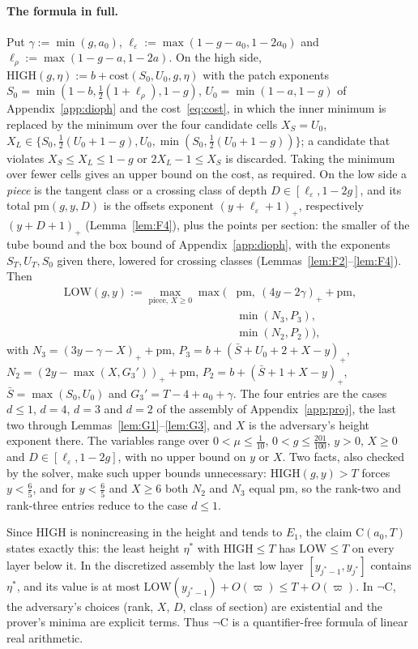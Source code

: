 \documentclass[aps,prx,twocolumn,superscriptaddress,nofootinbib,longbibliography]{revtex4-2}
\theoremstyle{plain}
\theoremstyle{definition}
\theoremstyle{remark}
\begin{document}
\paragraph{The formula in full.} Put $\gamma:=\min(g,a_0)$, $\ell_\varepsilon:=\max(1-g-a_0,1-2a_0)$ and $\ell_\rho:=\max(1-g-a,1-2a)$. On the high side, $\mathrm{HIGH}(g,\eta):=b+\mathrm{cost}(S_0,U_0,g,\eta)$ with the patch exponents $S_0=\min(1-b,\tfrac12(1+\ell_\rho),1-g)$, $U_0=\min(1-a,1-g)$ of Appendix~\ref{app:dioph} and the cost~\eqref{eq:cost}, in which the inner minimum is replaced by the minimum over the four candidate cells $X_S=U_0$, $X_L\in\{S_0,\tfrac12(U_0+1-g),U_0,\min(S_0,\tfrac12(U_0+1-g))\}$; a candidate that violates $X_S\le X_L\le1-g$ or $2X_L-1\le X_S$ is discarded. Taking the minimum over fewer cells gives an upper bound on the cost, as required. On the low side a \emph{piece} is the tangent class or a crossing class of depth $D\in[\ell_\varepsilon,1-2g]$, and its total $\mathrm{pm}(g,y,D)$ is the offsets exponent $(y+\ell_\varepsilon+1)_+$, respectively $(y+D+1)_+$ (Lemma~\ref{lem:F4}), plus the points per section: the smaller of the tube bound and the box bound of Appendix~\ref{app:dioph}, with the exponents $S_T,U_T,S_0$ given there, lowered for crossing classes (Lemmas~\ref{lem:F2}--\ref{lem:F4}). Then
\[\begin{aligned}\mathrm{LOW}(g,y):=\max_{\text{piece},\,X\ge0}\max\big(&\mathrm{pm},\ (4y-2\gamma)_++\mathrm{pm},\\&\min(N_3,P_3),\\&\min(N_2,P_2)\big),\end{aligned}\]
with $N_3=(3y-\gamma-X)_++\mathrm{pm}$, $P_3=b+(\bar S+U_0+2+X-y)_+$, $N_2=(2y-\max(X,G_3'))_++\mathrm{pm}$, $P_2=b+(\bar S+1+X-y)_+$, $\bar S=\max(S_0,U_0)$ and $G_3'=T-4+a_0+\gamma$. The four entries are the cases $d\le1$, $d=4$, $d=3$ and $d=2$ of the assembly of Appendix~\ref{app:proj}, the last two through Lemmas~\ref{lem:G1}--\ref{lem:G3}, and $X$ is the adversary's height exponent there. The variables range over $0<\mu\le\tfrac1{10}$, $0<g\le\tfrac{201}{100}$, $y>0$, $X\ge0$ and $D\in[\ell_\varepsilon,1-2g]$, with no upper bound on $y$ or $X$. Two facts, also checked by the solver, make such upper bounds unnecessary: $\mathrm{HIGH}(g,y)>T$ forces $y<\tfrac65$, and for $y<\tfrac65$ and $X\ge6$ both $N_2$ and $N_3$ equal $\mathrm{pm}$, so the rank-two and rank-three entries reduce to the case $d\le1$.

Since $\mathrm{HIGH}$ is nonincreasing in the height and tends to $E_1$, the claim $\mathrm C(a_0,T)$ states
exactly this: the least height $\eta^*$ with $\mathrm{HIGH}\le T$ has $\mathrm{LOW}\le T$ on every layer
below it. In the discretized assembly the last low layer $[y_{j^*-1},y_{j^*}]$ contains $\eta^*$, and its value is at most $\mathrm{LOW}(y_{j^*-1})+O(\varpi)\le T+O(\varpi)$. In $\neg\mathrm C$, the adversary's choices (rank, $X$, $D$, class of section) are existential and the
prover's minima are explicit terms. Thus $\neg\mathrm C$ is a quantifier-free formula of linear real
arithmetic.
\end{document}
